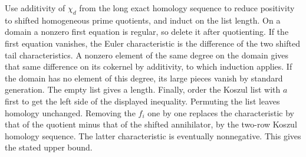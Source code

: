 \documentclass[11pt]{amsart}
\theoremstyle{definition}
\theoremstyle{remark}
\begin{document}
Use additivity of $\chi_d$ from the long exact homology sequence
to reduce positivity to shifted homogeneous prime quotients, and
induct on the list length. On a domain a nonzero first equation
is regular, so delete it after quotienting. If the first equation
vanishes, the Euler characteristic is the difference of the two
shifted tail characteristics. A nonzero element of the same degree
on the domain gives that same difference on its cokernel by
additivity, to which induction applies. If the domain has no element
of this degree, its large pieces vanish by standard generation.
The empty list gives a length. Finally, order the Koszul list with
$a$ first to get the left side of the displayed inequality.
Permuting the list leaves homology unchanged. Removing the $f_i$
one by one replaces the characteristic by that of the quotient
minus that of the shifted annihilator, by the two-row Koszul
homology sequence. The latter characteristic is eventually
nonnegative. This gives the stated upper bound.
\end{document}
